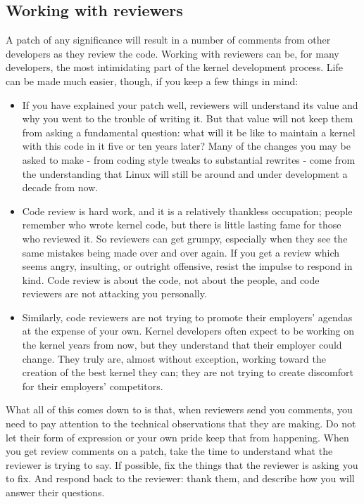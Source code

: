 \documentclass[a4paper,8pt,english]{sphinxmanual}
\begin{document}
\subsection{Working with reviewers}
\label{process/6.Followthrough:working-with-reviewers}
A patch of any significance will result in a number of comments from other
developers as they review the code.  Working with reviewers can be, for
many developers, the most intimidating part of the kernel development
process.  Life can be made much easier, though, if you keep a few things in
mind:
\begin{itemize}
\item {} 
If you have explained your patch well, reviewers will understand its
value and why you went to the trouble of writing it.  But that value
will not keep them from asking a fundamental question: what will it be
like to maintain a kernel with this code in it five or ten years later?
Many of the changes you may be asked to make - from coding style tweaks
to substantial rewrites - come from the understanding that Linux will
still be around and under development a decade from now.

\item {} 
Code review is hard work, and it is a relatively thankless occupation;
people remember who wrote kernel code, but there is little lasting fame
for those who reviewed it.  So reviewers can get grumpy, especially when
they see the same mistakes being made over and over again.  If you get a
review which seems angry, insulting, or outright offensive, resist the
impulse to respond in kind.  Code review is about the code, not about
the people, and code reviewers are not attacking you personally.

\item {} 
Similarly, code reviewers are not trying to promote their employers'
agendas at the expense of your own.  Kernel developers often expect to
be working on the kernel years from now, but they understand that their
employer could change.  They truly are, almost without exception,
working toward the creation of the best kernel they can; they are not
trying to create discomfort for their employers' competitors.

\end{itemize}

What all of this comes down to is that, when reviewers send you comments,
you need to pay attention to the technical observations that they are
making.  Do not let their form of expression or your own pride keep that
from happening.  When you get review comments on a patch, take the time to
understand what the reviewer is trying to say.  If possible, fix the things
that the reviewer is asking you to fix.  And respond back to the reviewer:
thank them, and describe how you will answer their questions.
\end{document}
